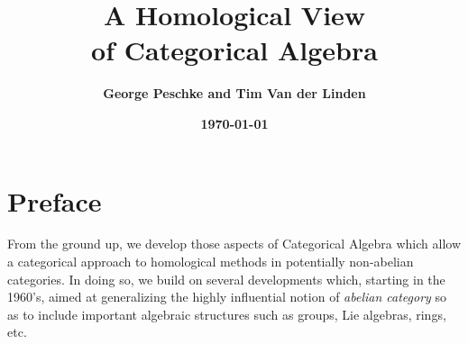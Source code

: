 \documentclass [12pt,oneside]{book}%
\theoremstyle{captionstyle}  %
\begin{document}
\title{\bfseries\Huge A Homological View\\ of Categorical Algebra}
\author{\bfseries\Large George Peschke and Tim Van der Linden}
\date{\textbf{\today}}
\maketitle

\thispagestyle{empty}
\newpage

\pagestyle{plain} %

\tableofcontents

\newpage

\setcounter{page}{1}
%
\rhead{\bfseries\footnotesize%
}
\chapter*{Preface}

From the ground up, we develop those aspects of Categorical Algebra which allow a categorical approach to homological methods in potentially non-abelian categories. In doing so, we build on several developments which, starting in the 1960's, aimed at generalizing the highly influential notion of \emph{abelian category} \cite{Buchsbaum:ExactCats,Tohoku} so as to include important algebraic structures such as groups, Lie algebras, rings, etc.
\end{document}
